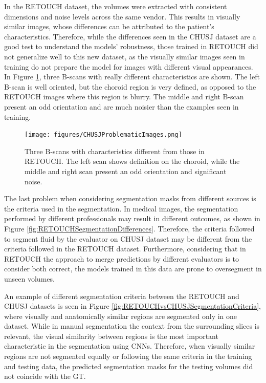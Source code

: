 In the RETOUCH dataset, the volumes were extracted with consistent dimensions and noise levels across the same vendor. This results in visually similar images, whose differences can be attributed to the patient's characteristics. Therefore, while the differences seen in the CHUSJ dataset are a good test to understand the models' robustness, those trained in RETOUCH did not generalize well to this new dataset, as the visually similar images seen in training do not prepare the model for images with different visual appearances. In Figure \ref{fig:CHUSJProblematicImages}, three B-scans with really different characteristics are shown. The left B-scan is well oriented, but the choroid region is very defined, as opposed to the RETOUCH images where this region is blurry. The middle and right B-scan present an odd orientation and are much noisier than the examples seen in training.

\begin{figure}[!ht]
	\centering
	\texttt{[image: figures/CHUSJProblematicImages.png]}
	\caption{Three B-scans with characteristics different from those in RETOUCH. The left scan shows definition on the choroid, while the middle and right scan present an odd orientation and significant noise.}
	\label{fig:CHUSJProblematicImages}
\end{figure}

The last problem when considering segmentation masks from different sources is the criteria used in the segmentation. In medical images, the segmentation performed by different professionals may result in different outcomes, as shown in Figure \ref{fig:RETOUCHSegmentationDifferences}. Therefore, the criteria followed to segment fluid by the evaluator on CHUSJ dataset may be different from the criteria followed in the RETOUCH dataset. Furthermore, considering that in RETOUCH the approach to merge predictions by different evaluators is to consider both correct, the models trained in this data are prone to oversegment in unseen volumes.
\par
An example of different segmentation criteria between the RETOUCH and CHUSJ datasets is seen in Figure \ref{fig:RETOUCHvsCHUSJSegmentationCriteria}, where visually and anatomically similar regions are segmented only in one dataset. While in manual segmentation the context from the surrounding slices is relevant, the visual similarity between regions is the most important characteristic in the segmentation using CNNs. Therefore, when visually similar regions are not segmented equally or following the same criteria in the training and testing data, the predicted segmentation masks for the testing volumes did not coincide with the GT.

